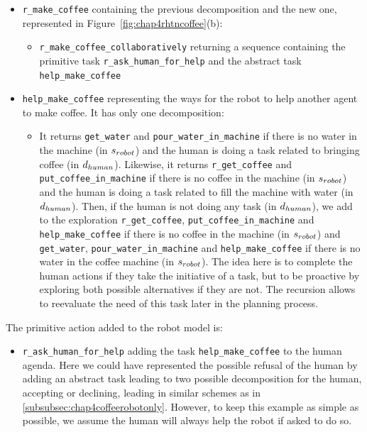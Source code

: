 \documentclass[a4paper,11pt,twoside]{StyleThese}
\begin{document}
\begin{itemize}
\item \verb'r_make_coffee' containing the previous decomposition and the new one, represented in Figure~\ref{fig:chap4rhtncoffee}(b):
	\begin{itemize}
	\item \verb'r_make_coffee_collaboratively' returning a sequence containing the primitive task \verb'r_ask_human_for_help' and the abstract task \verb'help_make_coffee'
	\end{itemize}
\item \verb'help_make_coffee' representing the ways for the robot to help another agent to make coffee. It has only one decomposition:
	\begin{itemize}
	\item It returns \verb'get_water' and \verb'pour_water_in_machine' if there is no water in the machine (in $s_{robot}$) and the human is doing a task related to bringing coffee (in $d_{human}$). Likewise, it returns \verb'r_get_coffee' and \verb'put_coffee_in_machine' if there is no coffee in the machine (in $s_{robot}$) and the human is doing a task related to fill the machine with water (in $d_{human}$). Then, if the human is not doing any task (in $d_{human}$), we add to the exploration \verb'r_get_coffee', \verb'put_coffee_in_machine' and \verb'help_make_coffee' if there is no coffee in the machine (in $s_{robot}$) and \verb'get_water', \verb'pour_water_in_machine' and \verb'help_make_coffee' if there is no water in the coffee machine (in $s_{robot}$). The idea here is to complete the human actions if they take the initiative of a task, but to be proactive by exploring both possible alternatives if they are not. The recursion allows to reevaluate the need of this task later in the planning process.
	\end{itemize}
\end{itemize}

The primitive action added to the robot model is:
\begin{itemize}
\item \verb'r_ask_human_for_help' adding the task \verb'help_make_coffee' to the human agenda. Here we could have represented the possible refusal of the human by adding an abstract task leading to two possible decomposition for the human, accepting or declining, leading in similar schemes as in \ref{subsubsec:chap4coffeerobotonly}. However, to keep this example as simple as possible, we assume the human will always help the robot if asked to do so.
\end{itemize}
\end{document}
